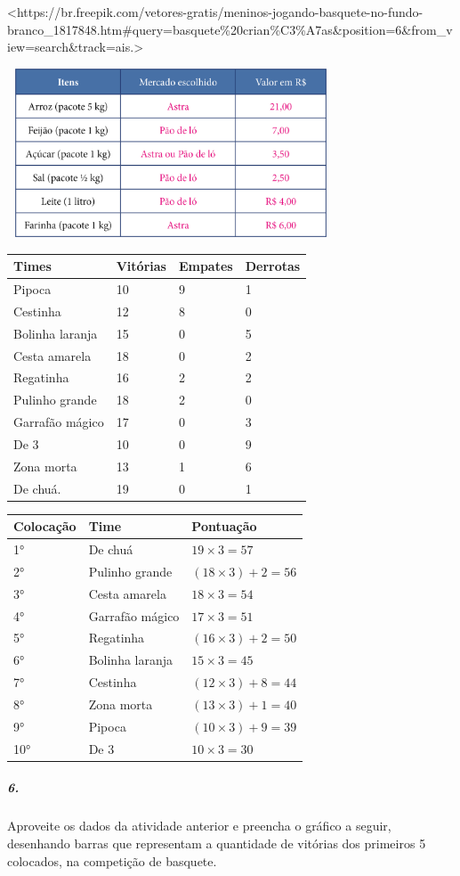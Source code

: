 \textless{}https://br.freepik.com/vetores-gratis/meninos-jogando-basquete-no-fundo-branco\_1817848.htm\#query=basquete\%20crian\%C3\%A7as\&position=6\&from\_view=search\&track=ais.\textgreater{}

\includegraphics[width=3.83333in,height=1.97257in]{media/image93.png}

\begin{longtable}[]{@{}llll@{}}
\toprule
Times & Vitórias & Empates & Derrotas\tabularnewline
\midrule
\endhead
Pipoca & 10 & 9 & 1\tabularnewline
Cestinha & 12 & 8 & 0\tabularnewline
Bolinha laranja & 15 & 0 & 5\tabularnewline
Cesta amarela & 18 & 0 & 2\tabularnewline
Regatinha & 16 & 2 & 2\tabularnewline
Pulinho grande & 18 & 2 & 0\tabularnewline
Garrafão mágico & 17 & 0 & 3\tabularnewline
De 3 & 10 & 0 & 9\tabularnewline
Zona morta & 13 & 1 & 6\tabularnewline
De chuá. & 19 & 0 & 1\tabularnewline
\bottomrule
\end{longtable}

\begin{longtable}[]{@{}lll@{}}
\toprule
Colocação & Time & Pontuação\tabularnewline
\midrule
\endhead
1° & De chuá & \(19 \times 3 = 57\ \)\tabularnewline
2° & Pulinho grande &
\(\left( 18 \times 3 \right) + 2 = 56\)\tabularnewline
3° & Cesta amarela & \(18 \times 3 = 54\ \)\tabularnewline
4° & Garrafão mágico & \(17 \times 3 = 51\ \)\tabularnewline
5° & Regatinha & \(\left( 16 \times 3 \right) + 2 = 50\)\tabularnewline
6° & Bolinha laranja & \(15 \times 3 = 45\ \)\tabularnewline
7° & Cestinha & \(\left( 12 \times 3 \right) + 8 = 44\)\tabularnewline
8° & Zona morta & \(\left( 13 \times 3 \right) + 1 = 40\)\tabularnewline
9° & Pipoca & \(\left( 10 \times 3 \right) + 9 = 39\)\tabularnewline
10° & De 3 & \(10 \times 3 = 30\ \)\tabularnewline
\bottomrule
\end{longtable}

\subparagraph{6.}\label{section-83}

Aproveite os dados da atividade anterior e preencha o gráfico a seguir,
desenhando barras que representam a quantidade de vitórias dos primeiros
5 colocados, na competição de basquete.

